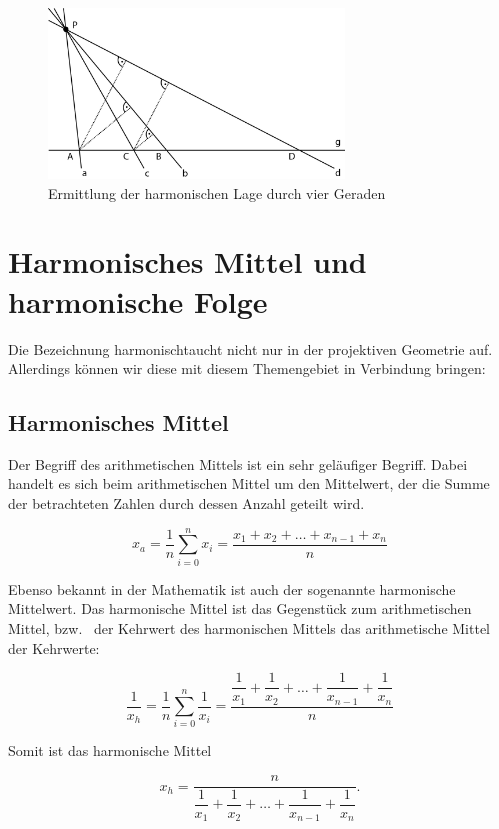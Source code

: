 \documentclass[12pt,a4paper]{article}
\begin{document}
\begin{figure}[htbp] 
\centering
\includegraphics[width=0.7\textwidth]{Bilder/vierGeraden.png}
\caption{Ermittlung der harmonischen Lage durch vier Geraden}
\label{fig:vierGeraden}
\end{figure}

\newpage
\section{Harmonisches Mittel und harmonische Folge}
\label{sec:harmMittel}

Die Bezeichnung \glqq harmonisch\grqq taucht nicht nur in der projektiven Geometrie auf. Allerdings können wir diese mit diesem Themengebiet in Verbindung bringen:

\subsection{Harmonisches Mittel}

Der Begriff des arithmetischen Mittels ist ein sehr geläufiger Begriff. Dabei handelt es sich beim arithmetischen Mittel um den Mittelwert, der die Summe der betrachteten Zahlen durch dessen Anzahl geteilt wird.

\[x_a = \dfrac{1}{n} \sum_{i=0}^n x_i = \dfrac{x_1 + x_2 + \dots + x_{n-1} + x_n}{n}\]

Ebenso bekannt in der Mathematik ist auch der sogenannte harmonische Mittelwert. Das harmonische Mittel ist das Gegenstück zum arithmetischen Mittel, bzw.~ der Kehrwert des harmonischen Mittels das arithmetische Mittel der Kehrwerte:

\[ \dfrac{1}{x_h} = \dfrac{1}{n} \sum_{i=0}^n \dfrac{1}{x_i} = \dfrac{\dfrac{1}{x_1} + \dfrac{1}{x_2} + \dots + \dfrac{1}{x_{n-1}} + \dfrac{1}{x_n}}{n}\]

Somit ist das harmonische Mittel

\[ x_h = \dfrac{n}{\dfrac{1}{x_1} + \dfrac{1}{x_2} + \dots + \dfrac{1}{x_{n-1}} + \dfrac{1}{x_n}}.\]
\end{document}
